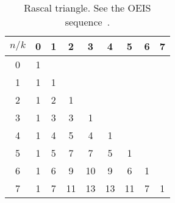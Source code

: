 ﻿\begin{table}[H]
    \begin{center}
        \setlength\extrarowheight{-6pt}
        \begin{tabular}{c|cccccccc}
            $n/k$ & 0 & 1 & 2  & 3  & 4  & 5  & 6 & 7 \\
            \hline
            0     & 1 &   &    &    &    &    &   &   \\
            1     & 1 & 1 &    &    &    &    &   &   \\
            2     & 1 & 2 & 1  &    &    &    &   &   \\
            3     & 1 & 3 & 3  & 1  &    &    &   &   \\
            4     & 1 & 4 & 5  & 4  & 1  &    &   &   \\
            5     & 1 & 5 & 7  & 7  & 5  & 1  &   &   \\
            6     & 1 & 6 & 9  & 10 & 9  & 6  & 1 &   \\
            7     & 1 & 7 & 11 & 13 & 13 & 11 & 7 & 1
        \end{tabular}
    \end{center}
    \caption{Rascal triangle. See the OEIS sequence~\cite{sloane2002rascal}.}
    \label{tab:rascal-triangle-i-1}
\end{table}
